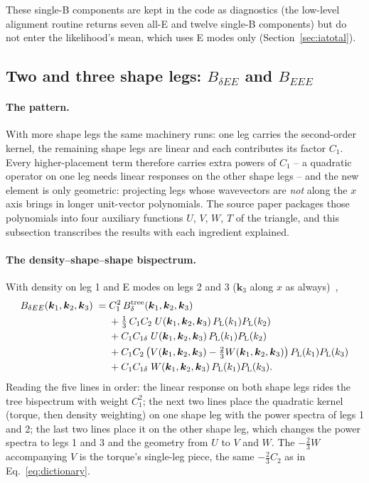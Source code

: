 \documentclass[11pt]{article}
\newcommand{\bk}{\boldsymbol{k}}
\numberwithin{equation}{section}
\begin{document}
These single-B components are kept in the code as diagnostics (the
low-level alignment routine returns seven all-E and twelve single-B
components) but do not enter the likelihood's mean, which uses E
modes only (Section~\ref{sec:iatotal}).

\subsection{Two and three shape legs:
  \texorpdfstring{$B_{\delta EE}$ and $B_{EEE}$}{density--E--E and E--E--E}}
\label{sec:bdeetrans}

\paragraph{The pattern.}
With more shape legs the same machinery runs: one leg carries the
second-order kernel, the remaining shape legs are linear and each
contributes its factor $C_1$.  Every higher-placement term therefore
carries extra powers of $C_1$ -- a quadratic operator on one leg
needs linear responses on the other shape legs -- and the new
element is only geometric: projecting legs whose wavevectors are
\emph{not} along the $x$ axis brings in longer unit-vector
polynomials.  The source paper packages those polynomials into four
auxiliary functions $U$, $V$, $W$, $T$ of the triangle, and this
subsection transcribes the results with each ingredient explained.

\paragraph{The density--shape--shape bispectrum.}
With density on leg 1 and E modes on legs 2 and 3
($\bk_3$ along $x$ as always)~\cite{GomesTATT},
\begin{equation}
\begin{split}
  B_{\delta EE}(\bk_1,\bk_2,\bk_3)
  \;=\;& C_1^2\, B^{\rm tree}_{\delta}(\bk_1,\bk_2,\bk_3) \\
  &+ \tfrac{1}{3}\,C_1 C_2\;
    U(\bk_1,\bk_2,\bk_3)\, P_{\rm L}(k_1) P_{\rm L}(k_2) \\
  &+ C_1 C_{1\delta}\;
    U(\bk_1,\bk_2,\bk_3)\, P_{\rm L}(k_1) P_{\rm L}(k_2) \\
  &+ C_1 C_2 \left(V(\bk_1,\bk_2,\bk_3)
    - \tfrac{2}{3} W(\bk_1,\bk_2,\bk_3)\right)
    P_{\rm L}(k_1) P_{\rm L}(k_3) \\
  &+ C_1 C_{1\delta}\;
    W(\bk_1,\bk_2,\bk_3)\, P_{\rm L}(k_1) P_{\rm L}(k_3) .
\end{split}
  \label{eq:bdee}
\end{equation}
Reading the five lines in order: the linear response on both shape
legs rides the tree bispectrum with weight $C_1^2$; the next two
lines place the quadratic kernel (torque, then density weighting) on
one shape leg with the power spectra of legs 1 and 2; the last two
lines place it on the other shape leg, which changes the power
spectra to legs 1 and 3 and the geometry from $U$ to $V$ and $W$.
The $-\tfrac23 W$ accompanying $V$ is the torque's single-leg piece,
the same $-\tfrac23 C_2$ as in Eq.~\eqref{eq:dictionary}.
\end{document}
